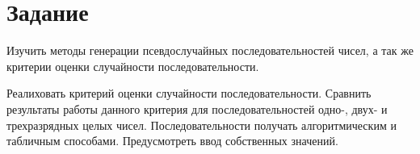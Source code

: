 \chapter{Задание}

Изучить методы генерации псевдослучайных последовательностей чисел, а так же критерии оценки случайности последовательности.

Реалиховать критерий оценки случайности последовательности. Сравнить результаты работы данного критерия для последовательностей одно-, двух- и трехразрядных целых чисел. Последовательности получать алгоритмическим и табличным способами. Предусмотреть ввод собственных значений.